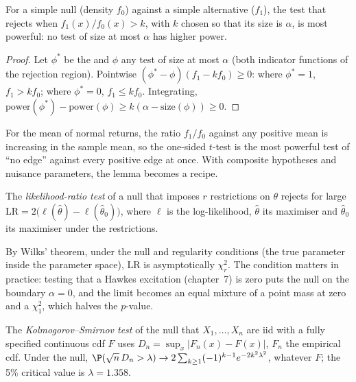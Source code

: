 \begin{theorem}\label{thm:qm:testing-and-multiple-testing:np}
For a simple null (density $f_0$) against a simple alternative ($f_1$), the test that rejects when $f_1(x)/f_0(x) > k$, with $k$
chosen so that its size is $\alpha$, is most powerful: no test of size at most $\alpha$ has higher power.
\end{theorem}

\begin{proof}
Let $\phi^*$ be the  and $\phi$ any test of size at most $\alpha$ (both indicator functions of the rejection
region). Pointwise $(\phi^* - \phi)(f_1 - kf_0) \ge 0$: where $\phi^* = 1$, $f_1 > kf_0$; where $\phi^* = 0$, $f_1 \le kf_0$.
Integrating, $\text{power}(\phi^*) - \text{power}(\phi) \ge k(\alpha - \text{size}(\phi)) \ge 0$.
\end{proof}

For the mean of normal returns, the ratio $f_1/f_0$ against any positive mean is increasing in the sample mean, so the
one-sided $t$-test is the most powerful test of ``no edge'' against every positive edge at once. With composite hypotheses and
nuisance parameters, the lemma becomes a recipe.

\begin{definition}\label{def:qm:testing-and-multiple-testing:lr}
The \emph{likelihood-ratio test} of a null that imposes $r$ restrictions on $\theta$ rejects for large
$\mathrm{LR} = 2\bigl(\ell(\hat\theta) - \ell(\hat\theta_0)\bigr)$, where $\ell$ is the log-likelihood, $\hat\theta$ its maximiser and
$\hat\theta_0$ its maximiser under the restrictions.
\end{definition}

By Wilks' theorem, under the null and regularity conditions (the true parameter inside the parameter space), $\mathrm{LR}$ is
asymptotically $\chi^2_r$. The condition matters in practice: testing that a Hawkes excitation (chapter~7) is zero puts the null
on the boundary $\alpha = 0$, and the limit becomes an equal mixture of a point mass at zero and a $\chi^2_1$, which halves
the $p$-value.

\begin{definition}\label{def:qm:testing-and-multiple-testing:ks}
The \emph{Kolmogorov--Smirnov test} of the null that $X_1, \dots, X_n$ are iid with a fully
specified continuous cdf $F$ uses $D_n = \sup_x|F_n(x) - F(x)|$, $F_n$ the empirical cdf. Under the null, $\P(\sqrt n\,D_n > \lambda)
\to 2\sum_{k \ge 1}(-1)^{k-1}e^{-2k^2\lambda^2}$, whatever $F$; the 5\% critical value is $\lambda = 1.358$.
\end{definition}


